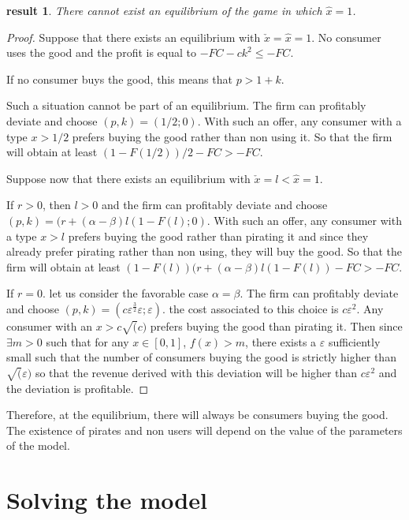 \documentclass[11pt]{article}
\newtheorem{result}{result}
\begin{document}
\begin{result}
There cannot exist an equilibrium of the game in which $\hat{x}=1$. 
\end{result}

\begin{proof}

Suppose that there exists an equilibrium with $\check{x} = \hat{x}=1$. No consumer uses the good and the profit is equal to $-FC-ck^2 \leq -FC$.

If no consumer buys the good, this means that $p>1+k$. 

Such a situation cannot be part of an equilibrium. The firm can profitably deviate and choose $(p,k)=(1/2;0)$. With such an offer, any consumer with a type $x>1/2$ prefers buying the good rather than non using it. So that the firm will obtain at least $(1-F(1/2))/2-FC> -FC$. 

Suppose now that there exists an equilibrium with $\check{x}=l < \hat{x}=1$.

If $r>0$, then $l>0$ and the firm can profitably deviate and choose $(p,k)=(r+(\alpha-\beta)l(1-F(l);0)$. With such an offer, any consumer with a type $x>l$ prefers buying the good rather than pirating it and since they already prefer pirating rather than non using, they will buy the good. So that the firm will obtain at least $(1-F(l))(r+(\alpha-\beta)l(1-F(l))-FC> -FC$. 

If $r=0$. let us consider the favorable case $\alpha=\beta$. The firm can profitably deviate and choose $(p,k)=(c\varepsilon^{\frac{3}{2}} \varepsilon;\varepsilon)$. the cost associated to this choice is $c\varepsilon^2$. Any consumer with an $x>c \sqrt(c)$ prefers buying the good than pirating it. Then since $\exists m>0$ such that for any $x \in [0,1]$, $f(x)>m$, there exists a  $\varepsilon$ sufficiently small such that  the number of consumers buying the good is strictly higher than $\sqrt(\varepsilon)$ so that the revenue derived with this deviation will be higher than $c\varepsilon^2$ and the deviation is profitable.

\end{proof}



Therefore, at the equilibrium, there will always be consumers buying the good. The existence of pirates and non users will depend on the value of the parameters of the model.

\section{Solving the model}
\end{document}
